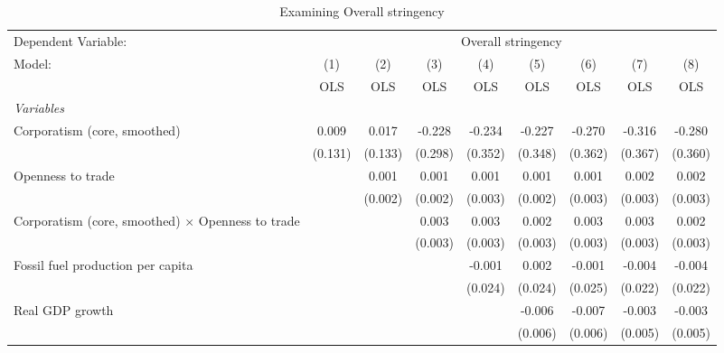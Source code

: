 
\begin{table}[htbp]
   \caption{Examining Overall stringency}
   \centering
   \begin{tabular}{lcccccccc}
      \toprule
      Dependent Variable: & \multicolumn{8}{c}{Overall stringency}\\
      Model:                                                   & (1)     & (2)     & (3)     & (4)     & (5)     & (6)     & (7)     & (8)\\  
                                                               &  OLS    & OLS     & OLS     & OLS     & OLS     & OLS     & OLS     & OLS\\  
      \midrule
      \emph{Variables}\\
      Corporatism (core, smoothed)                             & 0.009   & 0.017   & -0.228  & -0.234  & -0.227  & -0.270  & -0.316  & -0.280\\   
                                                               & (0.131) & (0.133) & (0.298) & (0.352) & (0.348) & (0.362) & (0.367) & (0.360)\\   
      Openness to trade                                        &         & 0.001   & 0.001   & 0.001   & 0.001   & 0.001   & 0.002   & 0.002\\   
                                                               &         & (0.002) & (0.002) & (0.003) & (0.002) & (0.003) & (0.003) & (0.003)\\   
      Corporatism (core, smoothed) $\times$ Openness to trade  &         &         & 0.003   & 0.003   & 0.002   & 0.003   & 0.003   & 0.002\\   
                                                               &         &         & (0.003) & (0.003) & (0.003) & (0.003) & (0.003) & (0.003)\\   
      Fossil fuel production per capita                        &         &         &         & -0.001  & 0.002   & -0.001  & -0.004  & -0.004\\   
                                                               &         &         &         & (0.024) & (0.024) & (0.025) & (0.022) & (0.022)\\   
      Real GDP growth                                          &         &         &         &         & -0.006  & -0.007  & -0.003  & -0.003\\   
                                                               &         &         &         &         & (0.006) & (0.006) & (0.005) & (0.005)\\   

\end{tabular}
\end{table}

